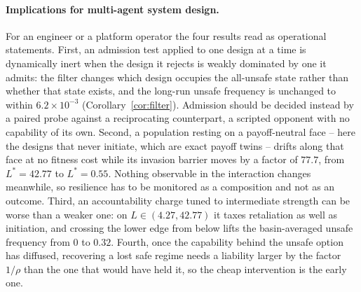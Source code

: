 \documentclass[pdflatex]{sn-jnl}
\theoremstyle{thmstyleone}
\theoremstyle{thmstylethree}
\theoremstyle{thmstyletwo}
\begin{document}
\paragraph{Implications for multi-agent system design.}
For an engineer or a platform operator the four results read as operational
statements. First, an admission test applied to one design at a time is
dynamically inert when the design it rejects is weakly dominated by one it
admits: the filter changes which design occupies the all-unsafe state rather
than whether that state exists, and the long-run unsafe frequency is unchanged
to within $6.2\times10^{-3}$ (Corollary~\ref{cor:filter}). Admission should be
decided instead by a paired probe against a reciprocating counterpart, a
scripted opponent with no capability of its own. Second, a population resting
on a payoff-neutral face -- here the designs that never initiate, which are
exact payoff twins -- drifts along that face at no fitness cost while its
invasion barrier moves by a factor of $77.7$, from $L^{*}=42.77$ to
$L^{*}=0.55$. Nothing observable in the interaction changes meanwhile, so
resilience has to be monitored as a composition and not as an outcome. Third,
an accountability charge tuned to intermediate strength can be worse than a
weaker one: on $L\in(4.27,42.77)$ it taxes retaliation as well as initiation,
and crossing the lower edge from below lifts the basin-averaged unsafe
frequency from $0$ to $0.32$. Fourth, once the capability behind the unsafe
option has diffused, recovering a lost safe regime needs a liability larger by
the factor $1/\rho$ than the one that would have held it, so the cheap
intervention is the early one.
\end{document}
